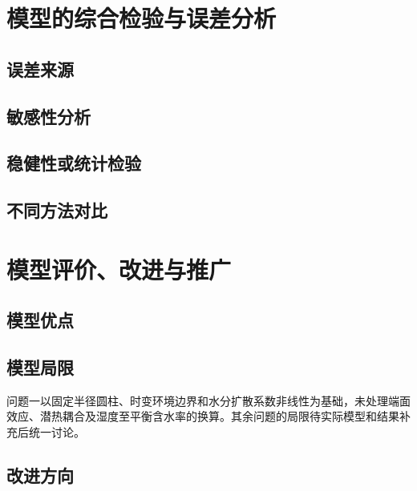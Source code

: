 \documentclass[withoutpreface,bwprint]{cumcmthesis}
\begin{document}
\clearpage
\section{模型的综合检验与误差分析}

\subsection{误差来源}
\vspace{0.08\textheight}

\subsection{敏感性分析}
\vspace{0.08\textheight}

\subsection{稳健性或统计检验}
\vspace{0.08\textheight}

\subsection{不同方法对比}
\vspace{0.08\textheight}

\clearpage
\section{模型评价、改进与推广}

\subsection{模型优点}
\vspace{0.06\textheight}

\subsection{模型局限}

问题一以固定半径圆柱、时变环境边界和水分扩散系数非线性为基础，未处理端面效应、潜热耦合及湿度至平衡含水率的换算。其余问题的局限待实际模型和结果补充后统一讨论。

\subsection{改进方向}
\vspace{0.06\textheight}
\end{document}
